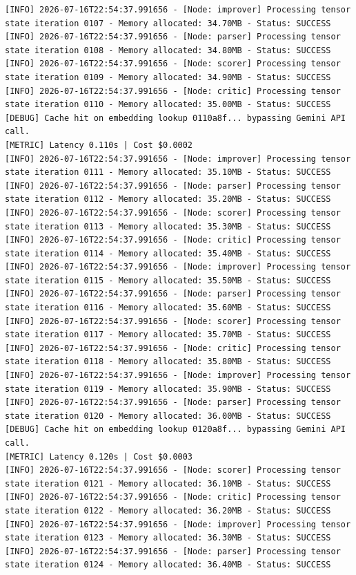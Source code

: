 \documentclass[10pt,journal,compsoc]{IEEEtran}
\begin{document}
\begin{verbatim}
[INFO] 2026-07-16T22:54:37.991656 - [Node: improver] Processing tensor state iteration 0107 - Memory allocated: 34.70MB - Status: SUCCESS
[INFO] 2026-07-16T22:54:37.991656 - [Node: parser] Processing tensor state iteration 0108 - Memory allocated: 34.80MB - Status: SUCCESS
[INFO] 2026-07-16T22:54:37.991656 - [Node: scorer] Processing tensor state iteration 0109 - Memory allocated: 34.90MB - Status: SUCCESS
[INFO] 2026-07-16T22:54:37.991656 - [Node: critic] Processing tensor state iteration 0110 - Memory allocated: 35.00MB - Status: SUCCESS
[DEBUG] Cache hit on embedding lookup 0110a8f... bypassing Gemini API call.
[METRIC] Latency 0.110s | Cost $0.0002
[INFO] 2026-07-16T22:54:37.991656 - [Node: improver] Processing tensor state iteration 0111 - Memory allocated: 35.10MB - Status: SUCCESS
[INFO] 2026-07-16T22:54:37.991656 - [Node: parser] Processing tensor state iteration 0112 - Memory allocated: 35.20MB - Status: SUCCESS
[INFO] 2026-07-16T22:54:37.991656 - [Node: scorer] Processing tensor state iteration 0113 - Memory allocated: 35.30MB - Status: SUCCESS
[INFO] 2026-07-16T22:54:37.991656 - [Node: critic] Processing tensor state iteration 0114 - Memory allocated: 35.40MB - Status: SUCCESS
[INFO] 2026-07-16T22:54:37.991656 - [Node: improver] Processing tensor state iteration 0115 - Memory allocated: 35.50MB - Status: SUCCESS
[INFO] 2026-07-16T22:54:37.991656 - [Node: parser] Processing tensor state iteration 0116 - Memory allocated: 35.60MB - Status: SUCCESS
[INFO] 2026-07-16T22:54:37.991656 - [Node: scorer] Processing tensor state iteration 0117 - Memory allocated: 35.70MB - Status: SUCCESS
[INFO] 2026-07-16T22:54:37.991656 - [Node: critic] Processing tensor state iteration 0118 - Memory allocated: 35.80MB - Status: SUCCESS
[INFO] 2026-07-16T22:54:37.991656 - [Node: improver] Processing tensor state iteration 0119 - Memory allocated: 35.90MB - Status: SUCCESS
[INFO] 2026-07-16T22:54:37.991656 - [Node: parser] Processing tensor state iteration 0120 - Memory allocated: 36.00MB - Status: SUCCESS
[DEBUG] Cache hit on embedding lookup 0120a8f... bypassing Gemini API call.
[METRIC] Latency 0.120s | Cost $0.0003
[INFO] 2026-07-16T22:54:37.991656 - [Node: scorer] Processing tensor state iteration 0121 - Memory allocated: 36.10MB - Status: SUCCESS
[INFO] 2026-07-16T22:54:37.991656 - [Node: critic] Processing tensor state iteration 0122 - Memory allocated: 36.20MB - Status: SUCCESS
[INFO] 2026-07-16T22:54:37.991656 - [Node: improver] Processing tensor state iteration 0123 - Memory allocated: 36.30MB - Status: SUCCESS
[INFO] 2026-07-16T22:54:37.991656 - [Node: parser] Processing tensor state iteration 0124 - Memory allocated: 36.40MB - Status: SUCCESS

\end{verbatim}
\end{document}
